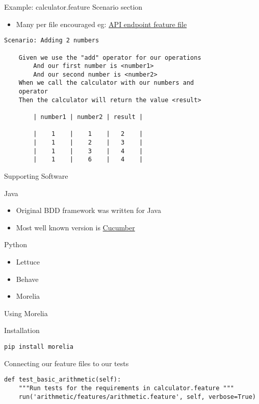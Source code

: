 \documentclass[bigger]{beamer}
\begin{document}
\begin{frame}[fragile,label={sec:orga4b5297}]{Example: calculator.feature Scenario section}
 \begin{itemize}
\item Many per file encouraged eg: \href{calculator/arithmetic/features/arithmetic.feature}{API endpoint feature file}
\end{itemize}

\scriptsize
\begin{verbatim}
Scenario: Adding 2 numbers

    Given we use the "add" operator for our operations
        And our first number is <number1>
        And our second number is <number2>
    When we call the calculator with our numbers and
    operator
    Then the calculator will return the value <result>

        | number1 | number2 | result |

        |    1    |    1    |   2    |
        |    1    |    2    |   3    |
        |    1    |    3    |   4    |
        |    1    |    6    |   4    |
\end{verbatim}
\end{frame}

\begin{frame}[label={sec:orge7b4e72}]{Supporting Software}
\begin{block}{Java}
\begin{itemize}
\item Original BDD framework was written for Java
\item Most well known version is \href{https:cucumber.io}{Cucumber}
\end{itemize}
\end{block}
\begin{block}{Python}
\begin{itemize}
\item Lettuce
\item Behave
\item Morelia
\end{itemize}
\end{block}
\end{frame}

\begin{frame}[fragile,label={sec:org194c28c}]{Using Morelia}
 \begin{block}{Installation}
\begin{verbatim}
pip install morelia
\end{verbatim}
\end{block}
\begin{block}{Connecting our feature files to our tests}
\scriptsize
\begin{verbatim}
def test_basic_arithmetic(self):
    """Run tests for the requirements in calculator.feature """
    run('arithmetic/features/arithmetic.feature', self, verbose=True)
\end{verbatim}
\end{block}
\end{frame}
\end{document}
